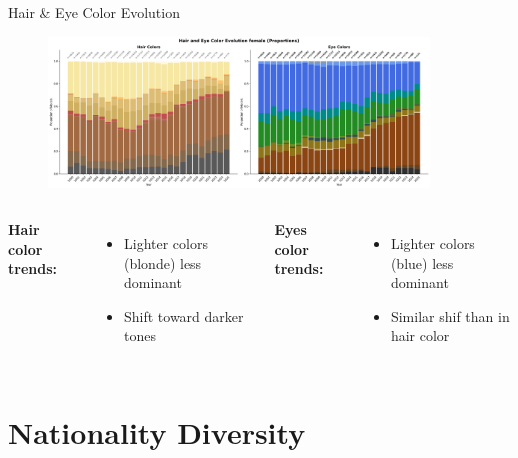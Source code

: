 \documentclass[aspectratio=169,xcolor=dvipsnames,10pt]{beamer}
\begin{document}
\begin{frame}{Hair \& Eye Color Evolution}
    \begin{figure}
        \centering
        \includegraphics[width=0.9\textwidth]{figures/hair_eye_color_female.png}
    \end{figure}
    
    \begin{columns}[c]
        \textbf{Hair color trends:}
        \begin{itemize}
            \item Lighter colors (blonde) less dominant
            \item Shift toward darker tones
        \end{itemize}
        
        \textbf{Eyes color trends:}
        \begin{itemize}
            \item Lighter colors (blue) less dominant
            \item Similar shif than in hair color
        \end{itemize}
    \end{columns}
\end{frame}



\section{Nationality Diversity}
\end{document}
